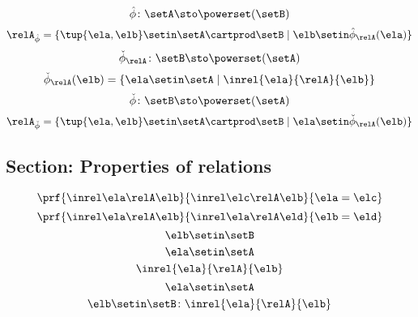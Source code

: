 \begin{forslides}
\begin{equation}
\end{equation}
\begin{equation}\label{eq:slides_session2_rel_120}
\hat \phi \colon \setA \sto \powerset (\setB)
\end{equation}
 \begin{equation}\label{eq:slides_session2_rel_121}
\relA_{\hat \phi} = \{ \tup{\ela, \elb} \setin \setA \cartprod \setB \mid \elb \setin \hat \phi_{\relA}(\ela)   \}
\end{equation}
\begin{equation}\label{eq:slides_session2_rel_122}
\check \phi_{\relA} \colon \setB \sto \powerset (\setA)
\end{equation}
 \begin{equation}\label{eq:slides_session2_rel_123}
\check \phi_{\relA} (\elb) = \{ \ela \setin \setA \mid \inrel{\ela}{\relA}{\elb}\}
\end{equation}
\begin{equation}\label{eq:slides_session2_rel_124}
\check \phi \colon \setB \sto \powerset (\setA)
\end{equation}
 \begin{equation}\label{eq:slides_session2_rel_125}
 \relA_{\check \phi} = \{ \tup{\ela, \elb} \setin \setA \cartprod \setB \mid \ela \setin \check \phi_{\relA}(\elb)\}
\end{equation}

\subsection{Section: Properties of relations}


\begin{equation}\label{eq:slides_session2_rel_126}
\prf{
                      \inrel \ela \relA \elb
                  }{
                      \inrel \elc \relA \elb
                  }{
                      \ela=\elc
                  }
\end{equation}
 \begin{equation}\label{eq:slides_session2_rel_127}
 \prf{
                      \inrel \ela \relA \elb
                  }{
                      \inrel \ela \relA \eld
                  }{
                      \elb = \eld
                  }
\end{equation}
\begin{equation}\label{eq:slides_session2_rel_128}
\elb\setin \setB
\end{equation}
 \begin{equation}\label{eq:slides_session2_rel_129}
\ela\setin \setA
\end{equation}
\begin{equation}\label{eq:slides_session2_rel_130}
\inrel{\ela}{\relA}{\elb}
\end{equation}
 \begin{equation}\label{eq:slides_session2_rel_131}
\ela\setin \setA
\end{equation}
\begin{equation}\label{eq:slides_session2_rel_132}
\elb \setin \setB\colon \inrel{\ela}{\relA}{\elb}
\end{equation}


\end{forslides}
